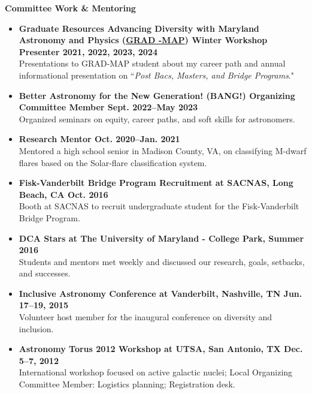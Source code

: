 \documentclass[letter,12pt]{article}
\begin{document}
\noindent
\vspace{-3mm}
{\bf Committee Work \& Mentoring} \\
\vspace{-13mm}
\begin{center}
\end{center}
\vspace{-3mm}
\begin{itemize}
    \item \textbf{Graduate Resources Advancing Diversity with Maryland Astronomy and Physics (\href{https://www.umdgradmap.org/}{GRAD -MAP}) Winter Workshop Presenter \hfill 2021, 2022, 2023, 2024} \\
    Presentations to GRAD-MAP student about my career path and annual informational presentation on ``{\it Post Bacs, Masters, and Bridge Programs}."
    \item \textbf{Better Astronomy for the New Generation! (BANG!) Organizing Committee Member \hfill Sept. 2022--May 2023} \\
    Organized seminars on equity, career paths, and soft skills for astronomers.
    \item \textbf{Research Mentor \hfill Oct. 2020--Jan. 2021} \\
    Mentored a high school senior in Madison County, VA, on classifying M-dwarf flares based on the Solar-flare classification system.
    \item \textbf{Fisk-Vanderbilt Bridge Program Recruitment at SACNAS, Long Beach, CA \hfill Oct. 2016} \\
    Booth at SACNAS to recruit undergraduate student for the Fisk-Vanderbilt Bridge Program.
    \item \textbf{DCA Stars at The University of Maryland - College Park, Summer 2016} \\
    Students and mentors met weekly and discussed our research, goals, setbacks, and successes.
    \item \textbf{Inclusive Astronomy Conference at Vanderbilt, Nashville, TN \hfill Jun. 17--19, 2015} \\
    Volunteer host member for the inaugural conference on diversity and inclusion.
    \item \textbf{Astronomy Torus 2012 Workshop at UTSA, San Antonio, TX \hfill Dec. 5--7, 2012} \\
    International workshop focused on active galactic nuclei; Local Organizing Committee Member: Logistics planning; Registration desk.
\end{itemize}
\end{document}
